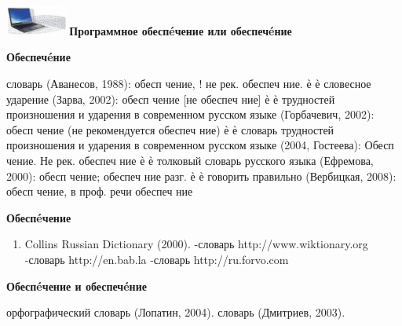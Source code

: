 \documentclass[aspectratio=169]{beamer}
\begin{document}
\begin{frame}
\Large
\includegraphics[width=2cm]{logo} {\bf Программное обеспéчение или обеспечéние}

\normalsize
{\bf  Обеспечéние}
\tiny
\begin{enumerate}
 словарь (Аванесов, 1988):
обесп чение, ! не рек. обеспеч ние. ѐ ѐ
 словесное ударение (Зарва, 2002): обесп чение [не обеспеч ние] ѐ ѐ
 трудностей произношения и ударения в современном русском языке (Горбачевич, 2002):
обесп чение (не рекомендуется обеспеч ние) ѐ ѐ
 словарь трудностей произношения и ударения в современном русском языке (2004,
Гостеева): Обесп чение. Не рек. обеспеч ние ѐ ѐ
 толковый словарь русского языка (Ефремова, 2000): обесп чение; обеспеч ние разг. ѐ ѐ
 говорить правильно (Вербицкая, 2008): обесп чение, в проф. речи обеспеч ние
\end{enumerate}
\normalsize
{\bf  Обеспéчение}
\tiny
\begin{enumerate}
 толковый словарь (Кузнецов, 2009).
 словарь (Ожегов, 1992).
 словарь (Ушаков, 1940).
-орфографический словарь (Тихонов, 2002).
\item Collins Russian Dictionary (2000).
-словарь http://www.wiktionary.org
-словарь http://en.bab.la
-словарь http://ru.forvo.com
\end{enumerate}
\normalsize
{\bf  Обеспéчение и обеспечéние}
\tiny
\begin{enumerate}
 орфографический словарь (Лопатин, 2004).
 словарь (Дмитриев, 2003).
\end{enumerate}
\end{frame}
\end{document}
